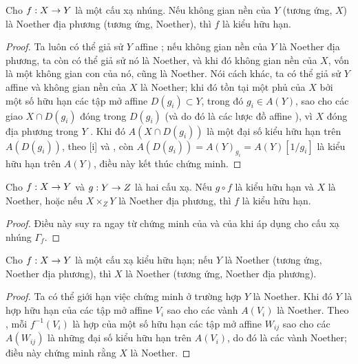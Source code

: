 \documentclass[oneside]{amsart}
\makeatletter
\newcommand{\ega@arrow}[2]{\mathchoice{#1}{#2}{#2}{#2}}
\renewcommand{\to}{\ega@arrow{\longrightarrow}{\rightarrow}}
\let\EGAOriginalLabel\label
\renewcommand{\label}[1]{\phantomsection\EGAOriginalLabel{#1}}
\makeatother
\begin{document}
\begin{corollary}[6.3.5]
\label{I.6.3.5}
Cho $f:X\to Y$ là một cấu xạ nhúng.
Nếu không gian nền của $Y$ (tương ứng, $X$) là Noether địa phương (tương
ứng, Noether), thì $f$ là kiểu hữu hạn.
\end{corollary}

\begin{proof}
Ta luôn có thể giả sử $Y$ affine ;
nếu không gian nền của $Y$ là Noether địa phương, ta còn có thể giả sử nó là
Noether, và khi đó không gian nền của $X$, vốn là một không gian con của nó,
cũng là Noether.
Nói cách khác, ta có thể giả sử $Y$ affine và không gian nền của $X$ là
Noether;
khi đó tồn tại một phủ của $X$ bởi một số hữu hạn các tập mở affine
$D(g_i)\subset Y$, trong đó $g_i\in A(Y)$, sao cho các giao
$X\cap D(g_i)$ đóng trong $D(g_i)$ (và do đó là các lược đồ affine
), vì $X$ đóng địa phương trong $Y$ .
Khi đó $A(X\cap D(g_i))$ là một đại số kiểu hữu hạn trên $A(D(g_i))$, theo
[i] và , còn
$A(D(g_i))=A(Y)_{g_i}=A(Y)[1/g_i]$ là kiểu hữu hạn trên $A(Y)$, điều này
kết thúc chứng minh.
\end{proof}

\begin{corollary}[6.3.6]
\label{I.6.3.6}
Cho $f:X\to Y$ và $g:Y\to Z$ là hai cấu xạ.
Nếu $g\circ f$ là kiểu hữu hạn và $X$ là Noether, hoặc nếu
$X\times_Z Y$ là Noether địa phương, thì $f$ là kiểu hữu hạn.
\end{corollary}

\begin{proof}
Điều này suy ra ngay từ chứng minh của  và của
 khi áp dụng cho cấu xạ nhúng $\Gamma_f$.
\end{proof}

\begin{proposition}[6.3.7]
\label{I.6.3.7}
Cho $f:X\to Y$ là một cấu xạ kiểu hữu hạn;
nếu $Y$ là Noether (tương ứng, Noether địa phương), thì $X$ là Noether
(tương ứng, Noether địa phương).
\end{proposition}

\begin{proof}
Ta có thể giới hạn việc chứng minh ở trường hợp $Y$ là Noether.
Khi đó $Y$ là hợp hữu hạn của các tập mở affine $V_i$ sao cho các vành
$A(V_i)$ là Noether.
Theo , mỗi $f^{-1}(V_i)$ là hợp của một số hữu hạn các tập
mở affine $W_{ij}$ sao cho các $A(W_{ij})$ là những đại số kiểu hữu hạn
trên $A(V_i)$, do đó là các vành Noether;
điều này chứng minh rằng $X$ là Noether.
\end{proof}
\end{document}
